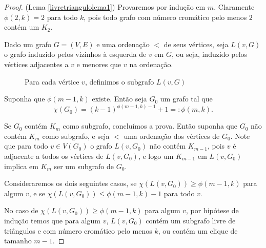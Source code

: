 \begin{proof}(Lema \ref{livretriangulolema1})
Provaremos por indução em $m$. Claramente $\phi(2,k) = 2$ para todo $k$, pois todo grafo com número cromático pelo menos $2$ contém um $K_2$.

Dado um grafo $G = (V,E)$ e uma ordenação $<$ de seus vértices, seja $L(v,G)$ o grafo induzido pelos vizinhos à esquerda de $v$ em $G$, ou seja, induzido pelos vértices adjacentes a $v$ e menores que $v$ na ordenação.

\begin{figure}[H]
\centering
{}
\caption{Para cada vértice $v$, definimos o subgrafo $L(v,G)$}
\label{fig:leftneighbor}
\end{figure}

Suponha que $\phi(m-1,k)$ existe. Então seja $G_0$ um grafo tal que \[\chi(G_0) = (k-1)^{\phi(m-1,k)-1}+1 =: \phi(m,k).\]

Se $G_0$ contém $K_m$ como subgrafo, concluímos a prova. Então suponha que $G_0$ não contém $K_m$ como subgrafo, e seja $<$ uma ordenação dos vértices de $G_0$. Note que para todo $v \in V(G_0)$ o grafo $L(v,G_0)$ não contém $K_{m-1}$, pois $v$ é adjacente a todos os vértices de $L(v,G_0)$, e logo um $K_{m-1}$ em $L(v,G_0)$ implica em $K_m$ ser um subgrafo de $G_0$.

Consideraremos os dois seguintes casos, se $\chi(L(v,G_0)) \geq \phi(m-1,k)$ para algum $v$, e se $\chi(L(v,G_0)) \leq \phi(m-1,k) - 1$ para todo $v$.

No caso de $\chi(L(v,G_0)) \geq \phi(m-1,k)$ para algum $v$, por hipótese de indução temos que para algum $v$, $L(v, G_0)$ contém um subgrafo livre de triângulos e com número cromático pelo menos $k$, ou contém um clique de tamanho $m-1$.


\end{proof}
